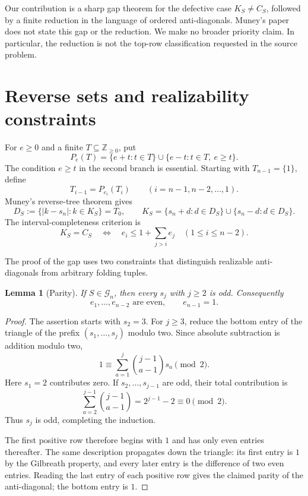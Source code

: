\documentclass[11pt]{article}
\newtheorem{lemma}[theorem]{Lemma}
\theoremstyle{remark}
\newcommand{\G}{\mathcal G}
\newcommand{\Z}{\mathbb Z}
\begin{document}
Our contribution is a sharp gap theorem for the defective case
$K_S\ne C_S$, followed by a finite reduction in the language of ordered
anti-diagonals.  Muney's paper does not state this gap or the reduction.
We make no broader priority claim.  In particular, the reduction is not the
top-row classification requested in the source problem.

\section{Reverse sets and realizability constraints}

For $e\ge0$ and a finite $T\subseteq\Z_{\ge0}$, put
\[
 P_e(T)=\{e+t:t\in T\}\cup\{e-t:t\in T,\ e\ge t\}.
\]
The condition $e\ge t$ in the second branch is essential.  Starting with
$T_{n-1}=\{1\}$, define
\[
 T_{i-1}=P_{e_i}(T_i)\qquad(i=n-1,n-2,\ldots,1).
\]
Muney's reverse-tree theorem gives
\begin{equation}\label{eq:reverse}
 D_S:=\{|k-s_n|:k\in K_S\}=T_0,
 \qquad
 K_S=\{s_n+d:d\in D_S\}\cup\{s_n-d:d\in D_S\}.
\end{equation}
The interval-completeness criterion is
\begin{equation}\label{eq:criterion}
 K_S=C_S
 \quad\Longleftrightarrow\quad
 e_i\le 1+\sum_{j>i}e_j
 \quad(1\le i\le n-2).
\end{equation}

The proof of the gap uses two constraints that distinguish realizable
anti-diagonals from arbitrary folding tuples.

\begin{lemma}[Parity]\label{lem:parity}
If $S\in\G_n$, then every $s_j$ with $j\ge2$ is odd.  Consequently
\[
 e_1,\ldots,e_{n-2}\text{ are even},\qquad e_{n-1}=1.
\]
\end{lemma}

\begin{proof}
The assertion starts with $s_2=3$.  For $j\ge3$, reduce the bottom entry of
the triangle of the prefix $(s_1,\ldots,s_j)$ modulo two.  Since absolute
subtraction is addition modulo two,
\[
 1\equiv \sum_{a=1}^{j}\binom{j-1}{a-1}s_a\pmod2.
\]
Here $s_1=2$ contributes zero.  If $s_2,\ldots,s_{j-1}$ are odd, their total
contribution is
\[
 \sum_{a=2}^{j-1}\binom{j-1}{a-1}=2^{j-1}-2\equiv0\pmod2.
\]
Thus $s_j$ is odd, completing the induction.

The first positive row therefore begins with $1$ and has only even entries
thereafter.  The same description propagates down the triangle: its first
entry is $1$ by the Gilbreath property, and every later entry is the
difference of two even entries.  Reading the last entry of each positive row
gives the claimed parity of the anti-diagonal; the bottom entry is $1$.
\end{proof}
\end{document}
